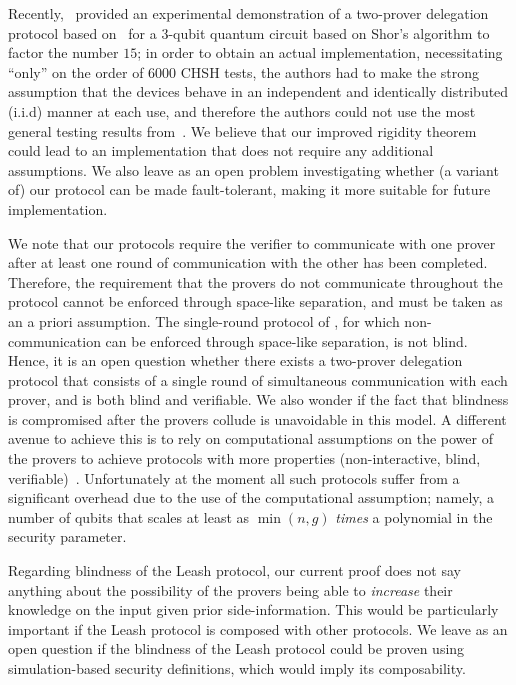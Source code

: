 Recently,~\cite{experiment_ruv} provided an experimental demonstration of a
two-prover delegation protocol based on~\cite{reichardt2012classical} for a
$3$-qubit quantum circuit based on Shor's algorithm to factor the number $15$;
in order to obtain an actual implementation, necessitating ``only'' on the order
of $6000$ CHSH tests, the authors had to make the strong assumption that the
devices behave in an independent and identically distributed (i.i.d) manner at each use, and therefore the authors could not use the most
general testing results from~\cite{reichardt2012classical}. We believe that our
improved rigidity theorem could lead to an implementation that does not require
any additional assumptions. We also leave as an open problem investigating whether (a
variant of) our protocol can be made fault-tolerant, making it more suitable for
future implementation.


We note that our protocols require the verifier to communicate with one
prover after at least one round of communication with the other has been
completed. Therefore, the requirement that the provers do not
communicate throughout the protocol cannot be enforced through space-like
separation, and must be taken as an a priori assumption.
The single-round protocol of \cite{Grilo17}, for which non-communication can be enforced through space-like separation, is not blind. Hence, it is an open question
whether there exists a two-prover
delegation protocol that consists of a single round of simultaneous
communication with each prover, and is both blind and verifiable. 
We also wonder if the fact that blindness is compromised after the provers
collude is unavoidable in this model.
A different
avenue to achieve this is to rely on computational assumptions on the power of
the provers to achieve protocols with more properties (non-interactive, blind,
verifiable)~\cite{dulek16,alagic2017quantum,mahadev2017,mahadev2018}. Unfortunately at the moment all such protocols suffer from a significant overhead due to the use of the computational assumption; namely, a number of qubits that scales at least as $\min(n,g)$ \emph{times} a polynomial in the security parameter. 

Regarding blindness of the Leash protocol, our current proof does not say anything about the possibility of the provers being able to {\em increase} their knowledge on the input given prior side-information. This would be particularly important if the Leash protocol is composed with other protocols. We leave as an open question if the blindness of the Leash protocol could be proven using simulation-based security definitions, which would imply its composability.


